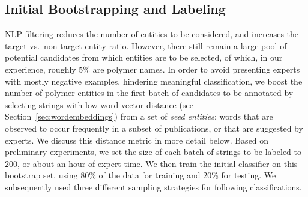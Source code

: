 \subsection{Initial Bootstrapping and Labeling}\label{sec:initial}
NLP filtering reduces the number of entities to be considered, and increases the target vs.\ non-target entity ratio.
However, there still remain a large pool of potential candidates from which entities are to be selected,
of which, in our experience, roughly 5\% are polymer names.
In order to avoid presenting experts with mostly negative examples, hindering meaningful classification,
we boost the number of polymer entities in the first batch of candidates to be annotated by
selecting strings with low word vector distance (see Section~\ref{sec:wordembeddings}) from
a set of \emph{seed entities}:
words that are observed to occur frequently  
in a subset of publications, or that are suggested by experts.
We discuss this distance metric in more detail below.
Based on preliminary experiments, we set the size of each batch of strings to be labeled to 200, 
or about an hour of expert time.
We then train the initial classifier on this bootstrap set, using 80\% of the data for training and 20\% for testing.
We subsequently used three different sampling strategies for following classifications.



